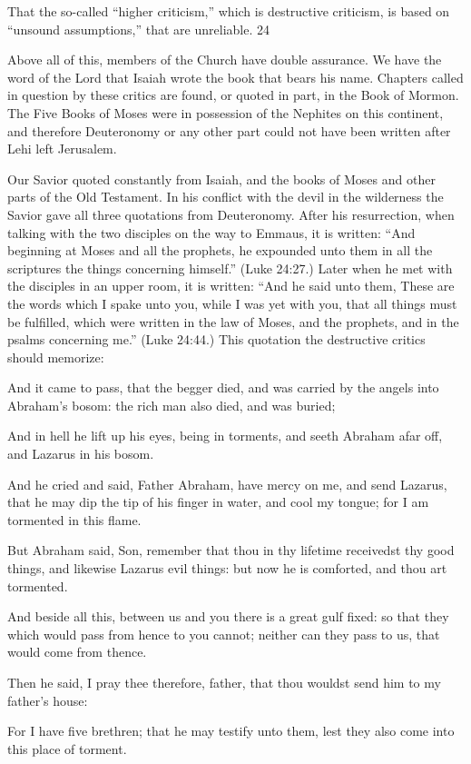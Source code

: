 That the so-called ``higher criticism,'' which is destructive criticism, is based on ``unsound
assumptions,'' that are unreliable. 24

Above all of this, members of the Church have double assurance. We have the word of the
Lord that Isaiah wrote the book that bears his name. Chapters called in question by these
critics are found, or quoted in part, in the Book of Mormon. The Five Books of Moses were
in possession of the Nephites on this continent, and therefore Deuteronomy or any other part
could not have been written after Lehi left Jerusalem.

Our Savior quoted constantly from Isaiah, and the books of Moses and other parts of the Old
Testament. In his conflict with the devil in the wilderness the Savior gave all three quotations
from Deuteronomy. After his resurrection, when talking with the two disciples on the way to
Emmaus, it is written: ``And beginning at Moses and all the prophets, he expounded unto
them in all the scriptures the things concerning himself.'' (Luke 24:27.) Later when he met
with the disciples in an upper room, it is written: ``And he said unto them, These are the
words which I spake unto you, while I was yet with you, that all things must be fulfilled,
which were written in the law of Moses, and the prophets, and in the psalms concerning me.''
(Luke 24:44.) This quotation the destructive critics should memorize:

And it came to pass, that the begger died, and was carried by the angels into Abraham's
bosom: the rich man also died, and was buried;

And in hell he lift up his eyes, being in torments, and seeth Abraham afar off, and Lazarus in
his bosom.

And he cried and said, Father Abraham, have mercy on me, and send Lazarus, that he may
dip the tip of his finger in water, and cool my tongue; for I am tormented in this flame.

But Abraham said, Son, remember that thou in thy lifetime receivedst thy good things, and
likewise Lazarus evil things: but now he is comforted, and thou art tormented.

And beside all this, between us and you there is a great gulf fixed: so that they which would
pass from hence to you cannot; neither can they pass to us, that would come from thence.

Then he said, I pray thee therefore, father, that thou wouldst send him to my father's house:

For I have five brethren; that he may testify unto them, lest they also come into this place of
torment.

